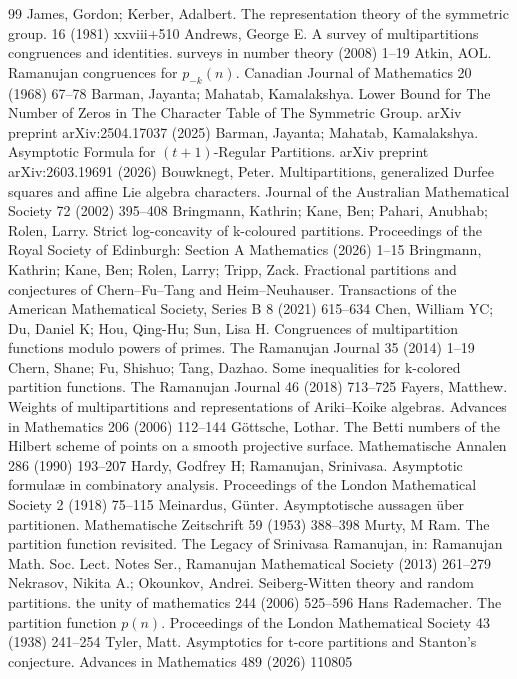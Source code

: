 \documentclass[10pt,a4paper]{amsart}
\numberwithin{equation}{section}
\begin{document}
\begin{thebibliography}{99}
 James, Gordon; Kerber, Adalbert. The representation theory of the symmetric group. 16 (1981) xxviii+510
 Andrews, George E. A survey of multipartitions congruences and identities. surveys in number theory (2008) 1--19
 Atkin, AOL. Ramanujan congruences for $p_{-k} (n)$. Canadian Journal of Mathematics 20 (1968) 67--78
 Barman, Jayanta; Mahatab, Kamalakshya. Lower Bound for The Number of Zeros in The Character Table of The Symmetric Group. arXiv preprint arXiv:2504.17037 (2025)
 Barman, Jayanta; Mahatab, Kamalakshya. Asymptotic Formula for $(t+ 1) $-Regular Partitions. arXiv preprint arXiv:2603.19691 (2026)
 Bouwknegt, Peter. Multipartitions, generalized {D}urfee squares and affine {L}ie algebra characters. Journal of the Australian Mathematical Society 72 (2002) 395--408
 Bringmann, Kathrin; Kane, Ben; Pahari, Anubhab; Rolen, Larry. Strict log-concavity of k-coloured partitions. Proceedings of the Royal Society of Edinburgh: Section A Mathematics (2026) 1–15
 Bringmann, Kathrin; Kane, Ben; Rolen, Larry; Tripp, Zack. Fractional partitions and conjectures of {C}hern--{F}u--{T}ang and {H}eim--{N}euhauser. Transactions of the American Mathematical Society, Series B 8 (2021) 615--634
 Chen, William YC; Du, Daniel K; Hou, Qing-Hu; Sun, Lisa H. Congruences of multipartition functions modulo powers of primes. The Ramanujan Journal 35 (2014) 1--19
 Chern, Shane; Fu, Shishuo; Tang, Dazhao. Some inequalities for k-colored partition functions. The Ramanujan Journal 46 (2018) 713--725
 Fayers, Matthew. Weights of multipartitions and representations of {A}riki--{K}oike algebras. Advances in Mathematics 206 (2006) 112--144
 G{\"o}ttsche, Lothar. The {B}etti numbers of the {H}ilbert scheme of points on a smooth projective surface. Mathematische Annalen 286 (1990) 193--207
 Hardy, Godfrey H; Ramanujan, Srinivasa. Asymptotic formula{\ae} in combinatory analysis. Proceedings of the London Mathematical Society 2 (1918) 75--115
 Meinardus, G{\"u}nter. Asymptotische aussagen {\"u}ber partitionen. Mathematische Zeitschrift 59 (1953) 388--398
 Murty, M Ram. The partition function revisited. The Legacy of Srinivasa Ramanujan, in: Ramanujan Math. Soc. Lect. Notes Ser., Ramanujan Mathematical Society (2013) 261--279
 Nekrasov, Nikita A.; Okounkov, Andrei. Seiberg-{W}itten theory and random partitions. the unity of mathematics 244 (2006) 525--596
 Hans Rademacher. The partition function $p(n)$. Proceedings of the London Mathematical Society 43 (1938) 241--254
 Tyler, Matt. Asymptotics for t-core partitions and {S}tanton's conjecture. Advances in Mathematics 489 (2026) 110805
\end{thebibliography}
\end{document}
